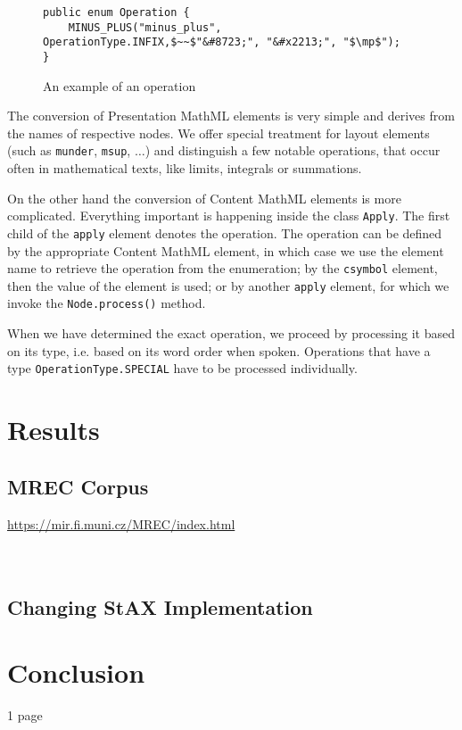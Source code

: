 \documentclass[11pt,oneside,final]{fithesis2}
\begin{document}
\begin{figure}[!ht]
\begin{lstlisting}[mathescape=true]
public enum Operation {
	MINUS_PLUS("minus_plus", OperationType.INFIX,$~~$"&#8723;", "&#x2213;", "$\mp$");
}
\end{lstlisting}
\caption{An example of an operation}
\label{fig:converter-operation}
\end{figure}

The conversion of Presentation MathML elements is very simple and derives from the names of respective nodes. We offer special treatment for layout elements (such as \texttt{munder}, \texttt{msup}, $\ldots$) and distinguish a few notable operations, that occur often in mathematical texts, like limits, integrals or summations. 

On the other hand the conversion of Content MathML elements is more complicated. Everything important is happening inside the class \texttt{Apply}. The first child of the \texttt{apply} element denotes the operation. The operation can be defined by the appropriate Content MathML element, in which case we use the element name to retrieve the operation from the enumeration; by the \texttt{csymbol} element, then the value of the element is used; or by another \texttt{apply} element, for which we invoke the \texttt{Node.process()} method. 

When we have determined the exact operation, we proceed by processing it based on its type, i.e. based on its word order when spoken. Operations that have a type \texttt{OperationType.SPECIAL} have to be processed individually.

\chapter{Results}
\section{MREC Corpus}
\url{https://mir.fi.muni.cz/MREC/index.html}\\
\\ \cite{mrec2011}
\\
\section{Changing StAX Implementation}


\chapter{Conclusion}
1 page



\end{document}
